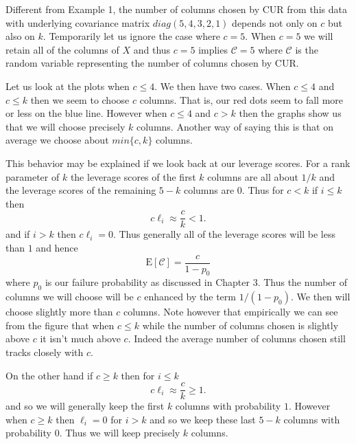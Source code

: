 \documentclass{book}
\begin{document}
Different from Example 1, the number of columns chosen by CUR from this data with underlying covariance matrix $diag(5,4,3,2,1)$ depends not only on $c$ but also on $k$. Temporarily let us ignore the case where $c=5$. When $c=5$ we will retain all of the columns of $X$ and thus $c=5$ implies $\mathscr{C}=5$ where $\mathscr{C}$ is the random variable representing the number of columns chosen by CUR. 

Let us look at the plots when $c \leq 4$. We then have two cases. When $c\leq 4$ and $c \leq k$ then we seem to choose $c$ columns. That is, our red dots seem to fall more or less on the blue line. However when $c\leq 4$ and $c > k$ then the graphs show us that we will choose precisely $k$ columns. Another way of saying this is that on average we choose about $min\{c,k\}$ columns. 

This behavior may be explained if we look back at our leverage scores. For a rank parameter of $k$ the leverage scores of the first $k$ columns are all about $1/k$ and the leverage scores of the remaining $5-k$ columns are $0$. Thus for $c<k$ if $i\leq k$ then
$$
c\ell_i\approx\frac{c}{k}<1.
$$
and if $i >k$ then $c\ell_i=0$. Thus generally all of the leverage scores will be less than $1$ and hence 
$$
\text{E}\left[\mathscr{C}\right]=\frac{c}{1-p_0}
$$
where $p_0$ is our failure probability as discussed in Chapter $3$. Thus the number of columns we will choose will be $c$ enhanced by the term $1/(1-p_0)$. We then will choose slightly more than $c$ columns. Note however that empirically we can see from the figure that when $c \leq k$ while the number of columns chosen is slightly above $c$ it isn't much above $c$. Indeed the average number of columns chosen still tracks closely with $c$. 

On the other hand if $c\geq k$ then for $i \leq k$
$$
c\ell_i\approx\frac{c}{k}\geq 1.
$$
and so we will generally keep the first $k$ columns with probability $1$. However when $c \geq k$ then $\ell_i=0$ for $i>k$ and so  we keep these last $5-k$ columns with probability $0$. Thus we will keep precisely $k$ columns. 
\end{document}
